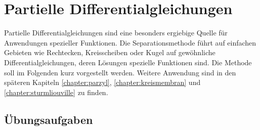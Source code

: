 %
%
%
\chapter{Partielle Differentialgleichungen
\label{buch:chapter:pde}}
\rhead{}
Partielle Differentialgleichungen sind eine besonders ergiebige
Quelle für Anwendungen spezieller Funktionen.
Die Separationsmethode führt auf einfachen Gebieten wie Rechtecken,
Kreisscheiben oder Kugel auf gewöhnliche Differentialgleichungen,
deren Lösungen spezielle Funktionen sind.
Die Methode soll im Folgenden kurz vorgestellt werden.
Weitere Anwendung sind in den späteren Kapiteln 
\ref{chapter:parzyl},
\ref{chapter:kreismembran}
und
\ref{chapter:sturmliouville}
zu finden.




%
%


\section*{Übungsaufgaben}
\begin{uebungsaufgaben}
\end{uebungsaufgaben}

